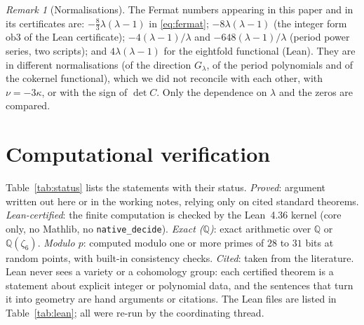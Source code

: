 \documentclass[10pt]{article}
\numberwithin{equation}{section}
\theoremstyle{remark}
\newtheorem{remark}[theorem]{Remark}
\newcommand{\QQ}{\mathbb{Q}}
\begin{document}
\begin{remark}[Normalisations]\label{rem:norm}
The Fermat numbers appearing in this paper and in its certificates are: $-\frac83\lambda(\lambda-1)$ in
\eqref{eq:fermat}; $-8\lambda(\lambda-1)$ (the integer form $\mathrm{ob3}$ of the Lean certificate);
$-4(\lambda-1)/\lambda$ and $-648(\lambda-1)/\lambda$ (period power series, two scripts); and
$4\lambda(\lambda-1)$ for the eightfold functional (Lean). They are in different normalisations (of the
direction $G_\lambda$, of the period polynomials and of the cokernel functional), which we did not reconcile
with each other, with $\nu=-3\kappa$, or with the sign of $\det C$. Only the dependence on $\lambda$ and the
zeros are compared.
\end{remark}

\section{Computational verification}\label{sec:verif}
Table~\ref{tab:status} lists the statements with their status. \emph{Proved}: argument written out here or in
the working notes, relying only on cited standard theorems. \emph{Lean-certified}: the finite computation is
checked by the Lean~4.36 kernel (core only, no Mathlib, no \texttt{native\_decide}). \emph{Exact ($\QQ$)}:
exact arithmetic over $\QQ$ or $\QQ(\zeta_6)$. \emph{Modulo $p$}: computed modulo one or more primes of $28$ to
$31$ bits at random points, with built-in consistency checks. \emph{Cited}: taken from the literature. Lean never
sees a variety or a cohomology group: each certified theorem is a statement about explicit integer or polynomial
data, and the sentences that turn it into geometry are hand arguments or citations. The Lean files are listed in
Table~\ref{tab:lean}; all were re-run by the coordinating thread.
\end{document}
